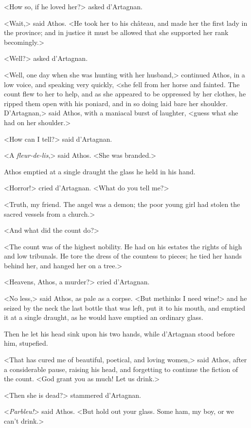 <How so, if he loved her?> asked d'Artagnan. 

<Wait,> said Athos. <He took her to his château, and made her the first lady in the province; and in justice it must be allowed that she supported her rank becomingly.> 

<Well?> asked d'Artagnan. 

<Well, one day when she was hunting with her husband,> continued Athos, in a low voice, and speaking very quickly, <she fell from her horse and fainted. The count flew to her to help, and as she appeared to be oppressed by her clothes, he ripped them open with his poniard, and in so doing laid bare her shoulder. D'Artagnan,> said Athos, with a maniacal burst of laughter, <guess what she had on her shoulder.> 

<How can I tell?> said d'Artagnan. 

<A \textit{fleur-de-lis},> said Athos. <She was branded.> 

Athos emptied at a single draught the glass he held in his hand. 

<Horror!> cried d'Artagnan. <What do you tell me?> 

<Truth, my friend. The angel was a demon; the poor young girl had stolen the sacred vessels from a church.> 

<And what did the count do?> 

<The count was of the highest nobility. He had on his estates the rights of high and low tribunals. He tore the dress of the countess to pieces; he tied her hands behind her, and hanged her on a tree.> 

<Heavens, Athos, a murder?> cried d'Artagnan. 

<No less,> said Athos, as pale as a corpse. <But methinks I need wine!> and he seized by the neck the last bottle that was left, put it to his mouth, and emptied it at a single draught, as he would have emptied an ordinary glass. 

Then he let his head sink upon his two hands, while d'Artagnan stood before him, stupefied. 

<That has cured me of beautiful, poetical, and loving women,> said Athos, after a considerable pause, raising his head, and forgetting to continue the fiction of the count. <God grant you as much! Let us drink.> 

<Then she is dead?> stammered d'Artagnan. 

<\textit{Parbleu!}> said Athos. <But hold out your glass. Some ham, my boy, or we can't drink.> 

